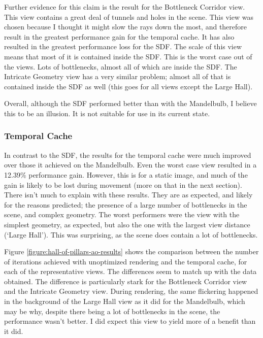 Further evidence for this claim is the result for the Bottleneck Corridor view. This view contains a great deal of tunnels and holes in the scene. This view was chosen because I thought it might slow the rays down the most, and therefore result in the greatest performance gain for the temporal cache. It has also resulted in the greatest performance loss for the SDF. The scale of this view means that most of it is contained inside the SDF. This is the worst case out of the views. Lots of bottlenecks, almost all of which are inside the SDF. The Intricate Geometry view has a very similar problem; almost all of that is contained inside the SDF as well (this goes for all views except the Large Hall).\newline

Overall, although the SDF performed better than with the Mandelbulb, I believe this to be an illusion. It is not suitable for use in its current state.

\subsubsection{Temporal Cache}

In contrast to the SDF, the results for the temporal cache were much improved over those it achieved on the Mandelbulb. Even the worst case view resulted in a 12.39\% performance gain. However, this is for a static image, and much of the gain is likely to be lost during movement (more on that in the next section). There isn't much to explain with these results. They are as expected, and likely for the reasons predicted; the presence of a large number of bottlenecks in the scene, and complex geometry. The worst performers were the view with the simplest geometry, as expected, but also the one with the largest view distance (`Large Hall'). This was surprising, as the scene does contain a lot of bottlenecks.\newline

Figure \ref{figure:hall-of-pillars-ao-results} shows the comparison between the number of iterations achieved with unoptimized rendering and the temporal cache, for each of the representative views. The differences seem to match up with the data obtained. The difference is particularly stark for the Bottleneck Corridor view and the Intricate Geometry view. During rendering, the same flickering happened in the background of the Large Hall view as it did for the Mandelbulb, which may be why, despite there being a lot of bottlenecks in the scene, the performance wasn't better. I did expect this view to yield more of a benefit than it did.\newline

